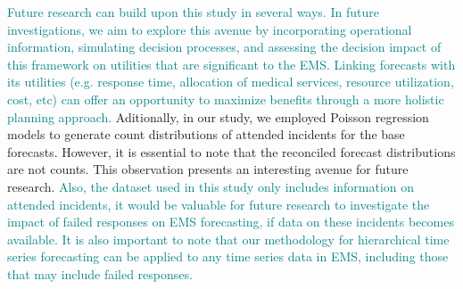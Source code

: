 \documentclass[
  authoryear,
  preprint,
  3p]{elsarticle}
\begin{document}
\textcolor{teal}{Future research can build upon this study in several ways. In future investigations, we aim to explore this avenue by incorporating operational information, simulating decision processes, and assessing the decision impact of this framework on utilities that are significant to the EMS. Linking forecasts with its utilities (e.g. response time, allocation of medical services, resource utilization, cost, etc) can offer an opportunity to maximize benefits through a more holistic planning approach.}
Aditionally, in our study, we employed Poisson regression models to
generate count distributions of attended incidents for the base
forecasts. However, it is essential to note that the reconciled forecast
distributions are not counts. This observation presents an interesting
avenue for future research.
\textcolor{teal}{Also, the dataset used in this study only includes information on attended incidents, it would be valuable for future research to investigate the impact of failed responses on EMS forecasting, if data on these incidents becomes available. It is also important to note that our methodology for hierarchical time series forecasting can be applied to any time series data in EMS, including those that may include failed responses.}
\end{document}
